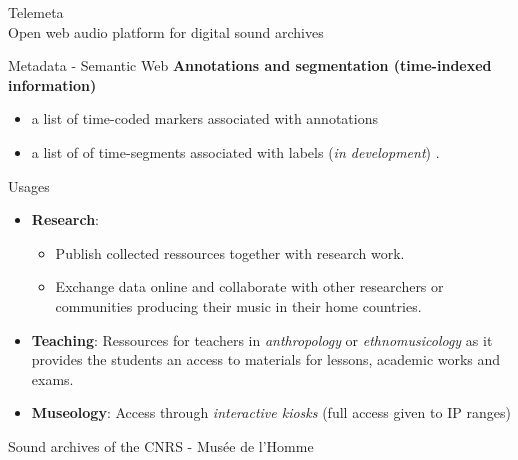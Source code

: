 \documentclass[final, hyperref, table]{beamer}
\begin{document}
\begin{frame}[containsverbatim]{}
\begin{columns}[T]
\begin{column}[T]{.5\linewidth}
\begin{block}{{\Large Telemeta}\\Open web audio platform for
          digital sound archives}
\begin{center}
\begin{minipage}[h]{0.97\linewidth}
\begin{block}{Metadata - Semantic Web}
            \textbf{Annotations and segmentation (time-indexed information)}
            \begin{itemize}
            \item a list of \alert{time-coded markers} associated with
              annotations
            \item a list of of \alert{time-segments} associated with
              labels (\emph{in development}) .
            \end{itemize}
          \end{block}
        \end{minipage}
    \end{center}
      \end{block}

      \begin{block}{Usages}
        \vspace{-0.5cm}
              \begin{itemize}
              \item \textbf{Research}:
                \begin{itemize}\footnotesize
                \item \alert{Publish} collected ressources together with research
                  work.
                \item \alert{Exchange} data online and \alert{collaborate} with other researchers or
                  communities producing their music in their home countries.
                \end{itemize}
              \item \textbf{Teaching}: Ressources for teachers in \emph{anthropology} or
                \emph{ethnomusicology} as it provides the students an access to
                materials for lessons, academic works and exams.
              \item \textbf{Museology}: Access through \emph{interactive kiosks} (full access given to IP ranges)
              \end{itemize}
       
    \end{block}

      \begin{block}{Sound archives of the CNRS - Musée de l'Homme}
        \begin{center}
        \end{center}


\end{block}
\end{column}
\end{columns}
\end{frame}
\end{document}
